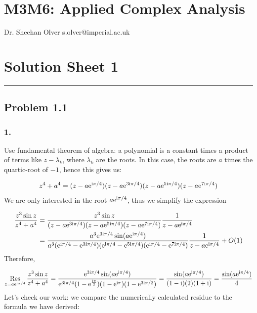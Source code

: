 \documentclass[12pt,a4paper]{article}
\def\I{ {\rm i} }
\def\E{ {\rm e} }
\def\Res_#1{\underset{#1}{\rm Res}\,}
\begin{document}
\section{M3M6: Applied Complex Analysis}
Dr. Sheehan Olver s.olver@imperial.ac.uk

\section{Solution Sheet 1}
\rule{\textwidth}{1pt}
\subsection{Problem 1.1}
\subsubsection{1.}
Use fundamental theorem of algebra: a polynomial is a constant times a product of terms like $z - \lambda_k$, where $\lambda_k$ are the roots. In this case, the roots are $a$ times the quartic-root of $-1$, hence  this gives us:


\begin{align*}
z^4 + a^4 = (z-a \E^{\I \pi /4})(z-a \E^{3\I \pi /4})(z-a \E^{5\I \pi /4})(z-a \E^{7\I \pi /4})  
\end{align*}
We are only interested in the root $a \E^{\I \pi /4}$, thus we simplify the expression


\begin{align*}
{z^3 \sin z \over z^4 + a^4} &= {z^3 \sin z \over (z-a \E^{3\I \pi /4})(z-a \E^{5\I \pi /4})(z-a \E^{7\I \pi /4})} {1 \over z-a \E^{\I \pi /4}} \\
  &= {a^3\E^{3\I \pi /4} \sin(a \E^{\I \pi /4}) \over a^3 (\E^{\I \pi / 4} - \E^{3\I \pi /4})(\E^{\I \pi / 4} - \E^{5\I \pi /4})(\E^{\I \pi / 4} - \E^{7\I \pi /4})} {1 \over z-a \E^{\I \pi /4}} + O(1)
\end{align*}
Therefore, 

\[
\Res_{z = a \E^{\I \pi /4}} {z^3 \sin z \over z^4 + a^4} = { \E^{3\I \pi /4} \sin(a \E^{\I \pi /4}) \over \E^{3\I \pi /4} (1 - \E^{\I \pi \over 2})(1 - \E^{\I \pi })(1 - \E^{3\I \pi/2 })}= { \sin(a \E^{\I \pi /4}) \over (1 - \I) (2) (1+ \I)}= { \sin(a \E^{\I \pi /4}) \over 4}
\]
Let's check our work: we compare the numerically calculated residue to the formula we have derived:
\end{document}
